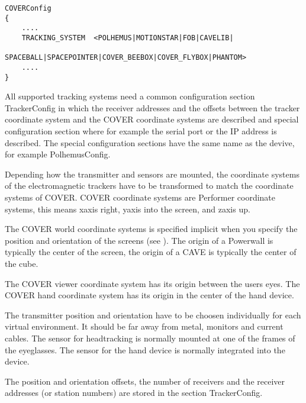 \begin{samepage}
\small \begin{verbatim}
COVERConfig
{
    ....
    TRACKING_SYSTEM  <POLHEMUS|MOTIONSTAR|FOB|CAVELIB|
                      SPACEBALL|SPACEPOINTER|COVER_BEEBOX|COVER_FLYBOX|PHANTOM>
    ....
}
\end{verbatim} \normalsize
\end{samepage}

All supported tracking systems need a common configuration section TrackerConfig
in which the receiver addresses and the offsets between the tracker coordinate system 
and the COVER coordinate systems are described and special configuration section 
where for example the serial port or the IP address is described. The special
configuration sections have the same name as the devive, for example PolhemusConfig.

Depending how the transmitter and sensors are mounted, the coordinate
systems of the electromagnetic trackers have to be transformed to match the 
coordinate systems of COVER. COVER coordinate systems are Performer 
coordinate systems, this means xaxis right, yaxis into the screen, and zaxis up.

The COVER world coordinate systems is specified implicit when you specify 
the position and orientation of the 
screens (see 
).
The origin of a Powerwall is typically the center of the screen, the origin 
of a CAVE is typically the center of the cube. 

The COVER viewer coordinate system has its origin between the users eyes.
The COVER hand coordinate system has its origin in the center of the hand 
device.

The transmitter position and orientation have to be choosen individually
for each virtual environment. It should be far away from metal, monitors
and current cables.
The sensor for headtracking is normally mounted at one of the frames of the eyeglasses.
The sensor for the hand device is normally integrated into the device.

The position and orientation offsets, the number of receivers and the receiver
addresses (or station numbers) are stored in the section 
TrackerConfig.

